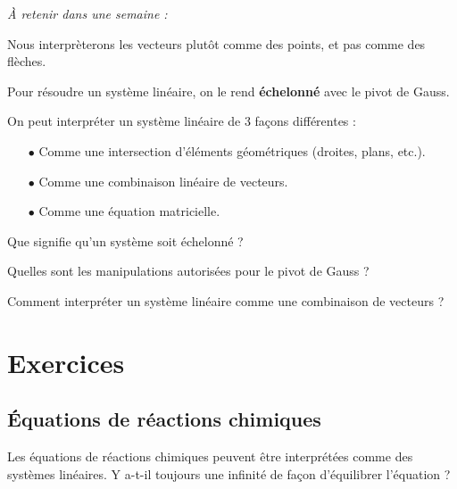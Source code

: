 
\begin{resumeBox}
  \emph{À retenir dans une semaine :} 
  \begin{niceitemize}
    \item Nous interprèterons les vecteurs plutôt comme des points, et pas comme des flèches.
    \item Pour résoudre un système linéaire, on le rend \textbf{échelonné} avec le pivot de Gauss.
    \item On peut interpréter un système linéaire de 3 façons différentes : 
      \begin{itemize}
        \item[$\bullet$] Comme une intersection d'éléments géométriques (droites, plans, etc.).
        \item[$\bullet$] Comme une combinaison linéaire de vecteurs.
        \item[$\bullet$] Comme une équation matricielle.
      \end{itemize}
  \end{niceitemize}
\end{resumeBox}
\begin{rappelsBox}
  \begin{niceitemize}
    \item Que signifie qu'un système soit échelonné ?
    \item Quelles sont les manipulations autorisées pour le pivot de Gauss ?
    \item Comment interpréter un système linéaire comme une combinaison de vecteurs ?
  \end{niceitemize}
\end{rappelsBox}

\section{Exercices}
  \subsection{Équations de réactions chimiques}
  Les équations de réactions chimiques peuvent être interprétées comme des systèmes linéaires. \newline
  Y a-t-il toujours une infinité de façon d'équilibrer l'équation ?


